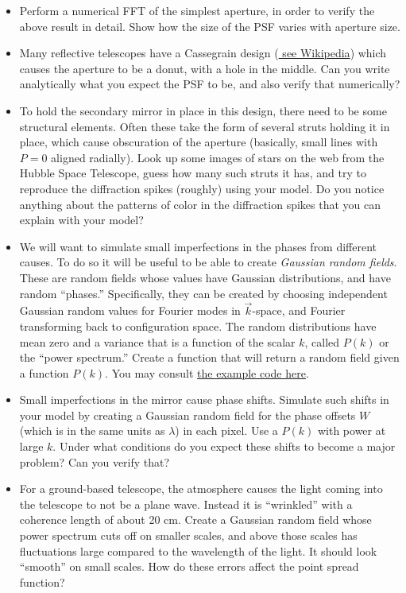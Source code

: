 \documentclass[11pt, preprint]{aastex}
\begin{document}
\begin{itemize}
\item Perform a numerical FFT of the simplest aperture, in order to
  verify the above result in detail. Show how the size of the PSF
  varies with aperture size.  
\item Many reflective telescopes have a Cassegrain design
  (\href{https://en.wikipedia.org/wiki/Cassegrain_reflector}{\color{blue}
  see Wikipedia}) which causes the aperture to be a donut, with a hole
  in the middle. Can you write analytically what you expect the PSF to
  be, and also verify that numerically?
\item To hold the secondary mirror in place in this design, there need
  to be some structural elements.  Often these take the form of
  several struts holding it in place, which cause obscuration of the
  aperture (basically, small lines with $P=0$ aligned radially). Look
  up some images of stars on the web from the Hubble Space Telescope,
  guess how many such struts it has, and try to reproduce the
  diffraction spikes (roughly) using your model. Do you notice
  anything about the patterns of color in the diffraction spikes that
  you can explain with your model?
\item We will want to simulate small imperfections in the phases from
  different causes. To do so it will be useful to be able to create
  {\it Gaussian random fields}. These are random fields whose values
  have Gaussian distributions, and have random ``phases.''
  Specifically, they can be created by choosing independent Gaussian
  random values for Fourier modes in $\vec{k}$-space, and Fourier
  transforming back to configuration space. The random distributions
  have mean zero and a variance that is a function of the scalar $k$,
  called $P(k)$ or the ``power spectrum.'' Create a function that will
  return a random field given a function $P(k)$.  You may consult
  \href{http://andrewwalker.github.io/statefultransitions/post/gaussian-fields/}{\color{blue}
    the example code here}.
\item Small imperfections in the mirror cause phase shifts. Simulate
  such shifts in your model by creating a Gaussian random field for
  the phase offsets $W$ (which is in the same units as $\lambda$) in
  each pixel. Use a $P(k)$ with power at large $k$. Under what
  conditions do you expect these shifts to become a major problem? Can
  you verify that?
\item For a ground-based telescope, the atmosphere causes the light
  coming into the telescope to not be a plane wave. Instead it is
  ``wrinkled'' with a coherence length of about 20 cm. Create a
  Gaussian random field whose power spectrum cuts off on smaller
  scales, and above those scales has fluctuations large compared to
  the wavelength of the light. It should look ``smooth'' on small
  scales.  How do these errors affect the point spread function?
\end{itemize}
\end{document}
